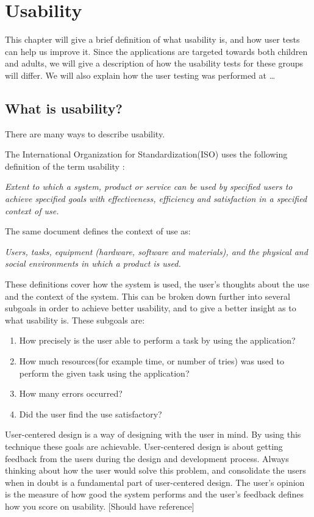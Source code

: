 \chapter{Usability}
\label{chp:usability}

This chapter will give a brief definition of what usability is, and how user tests can help us improve it. Since the applications are targeted towards both children and adults, we will give a description of how the usability tests for these groups will differ. We will also explain how the user testing was performed at \ldots

\section{What is usability?}
\label{sec:usability}
There are many ways to describe usability. 

The International Organization for Standardization(ISO) uses the following definition of the term usability \cite{isousability}:

\textit{Extent to which a system, product or service can be used by specified
users to achieve specified goals with effectiveness, efficiency
and satisfaction in a specified context of use.}

The same document defines the context of use as:

\textit{Users, tasks, equipment (hardware, software and materials), and
the physical and social environments in which a product is used.}

These definitions cover how the system is used, the user's thoughts about the use and the context of the system. This can be broken down further into several subgoals in order to achieve better usability, and to give a better insight as to what usability is. 
These subgoals are:

\begin{enumerate}
\item{How precisely is the user able to perform a task by using the application?}
\item{How much resources(for example time, or number of tries) was used to perform the given task using the application?}
\item{How many errors occurred?}
\item{Did the user find the use satisfactory?}
\end{enumerate}

User-centered design is a way of designing with the user in mind. By using this technique these goals are achievable. User-centered design is about getting feedback from the users during the design and development process. Always thinking about how the user would solve this problem, and consolidate the users when in doubt is a fundamental part of user-centered design. The user's opinion is the measure of how good the system performs and the user's feedback defines how you score on usability. [Should have reference]

